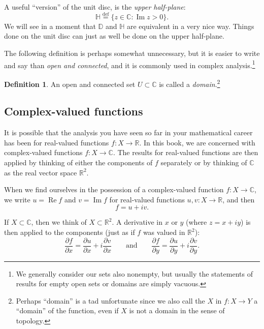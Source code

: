 \documentclass[12pt,openany]{book}
\renewcommand{\Re}{\operatorname{Re}}
\renewcommand{\Im}{\operatorname{Im}}
\newcommand{\C}{{\mathbb{C}}}
\newcommand{\R}{{\mathbb{R}}}
\newcommand{\D}{{\mathbb{D}}}
\newcommand{\bH}{{\mathbb{H}}}
\newcommand{\myindex}[1]{#1\index{#1}}
\newcommand{\myquote}[1]{``#1''}
\theoremstyle{plain}
\theoremstyle{remark}
\theoremstyle{definition}
\newtheorem{defn}[thm]{Definition}
\theoremstyle{exercise}
\theoremstyle{example}
\begin{document}
A useful \myquote{version} of the unit disc, is the \emph{\myindex{upper half-plane}}:
%
\begin{equation*}
\bH 
\overset{\text{def}}{=}
\bigl\{
z \in \C : \Im z > 0
\bigr\} .
\end{equation*}
We will see in a moment that $\D$ and $\bH$ are equivalent in a
very nice way.
Things done on the unit disc can just as well be done on the upper half-plane.

The following definition is perhaps somewhat unnecessary, but it is 
easier to write and say than \emph{open and connected}, and it is commonly
used in complex analysis.\footnote{We generally consider our sets
also nonempty, but usually the statements of results for empty open sets or
domains are simply vacuous.}

\begin{defn}
An open and connected set $U \subset \C$ is called a
\emph{\myindex{domain}}.\footnote{Perhaps \myquote{domain} is a tad unfortunate since
we also call the $X$ in $f \colon X \to Y$ a \myquote{domain} of the function,
even if $X$ is not a domain in the sense of topology.}
\end{defn}

\subsection{Complex-valued functions}

It is possible that the analysis you have seen so far in your mathematical
career has been for real-valued functions $f \colon X \to \R$.  In this
book, we are concerned with complex-valued functions $f \colon X \to \C$.
The results for real-valued functions are then applied by thinking of
either the components of $f$ separately or by thinking of $\C$ as the
real vector space $\R^2$.

When we find ourselves in the possession of a complex-valued function
$f \colon X \to \C$, we write $u = \Re f$
and $v = \Im f$ for real-valued functions $u,v \colon X \to \R$, and then
\begin{equation*}
f = u+iv .
\end{equation*}

If $X \subset \C$, then we think of $X \subset \R^2$.
A derivative in $x$ or $y$ (where $z=x+iy$) is then applied to the
components (just as if $f$ was valued in $\R^2$):
\begin{equation*}
\frac{\partial f}{\partial x} = 
\frac{\partial u}{\partial x} + i
\frac{\partial v}{\partial x}
\qquad\text{and}\qquad
\frac{\partial f}{\partial y} = 
\frac{\partial u}{\partial y} + i
\frac{\partial v}{\partial y} .
\end{equation*}
\end{document}
